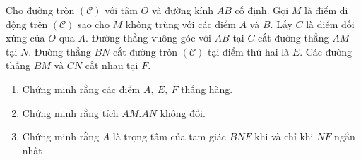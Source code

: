 \begin{ex}%
Cho đường tròn $ (\mathcal{C}) $ với tâm $ O $ và đường kính $ AB $ cố định. Gọi $ M $ là điểm di động trên $(\mathcal{C})$ sao cho $ M $ không trùng với các điểm $ A $ và $ B. $ Lấy $ C $ là điểm đối xứng của $ O $ qua $ A. $ Đường thẳng vuông góc với $ AB $ tại $ C $ cắt đường thẳng $ AM $ tại $ N. $ Đường thẳng $ BN $ cắt đường tròn $ (\mathcal{C}) $ tại điểm thứ hai là $ E. $ Các đường thẳng $ BM $ và $ CN $ cắt nhau tại $ F. $
	\begin{enumerate}
		\item Chứng minh rằng các điểm $ A,\ E,\ F $ thẳng hàng.
		\item Chứng minh rằng tích $ AM.AN $ không đổi.
		\item Chứng minh rằng $ A $ là trọng tâm của tam giác $ BNF $ khi và chỉ khi $ NF $ ngắn nhất
	\end{enumerate}


\end{ex}
